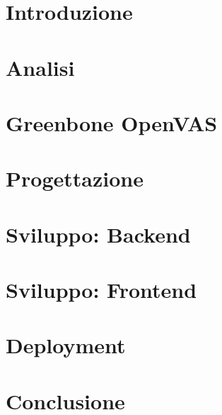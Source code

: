 \documentclass{book}
\begin{document}
  
  \tableofcontents
  \listoffigures
  \chapter{Introduzione}
  
  \chapter{Analisi}
  
  \chapter{Greenbone OpenVAS}
  
  \chapter{Progettazione}
  
  \chapter{Sviluppo: Backend}
  
  \chapter{Sviluppo: Frontend}
  
  \chapter{Deployment}
  
  \chapter{Conclusione}
  

  \printbibliography
\end{document}
